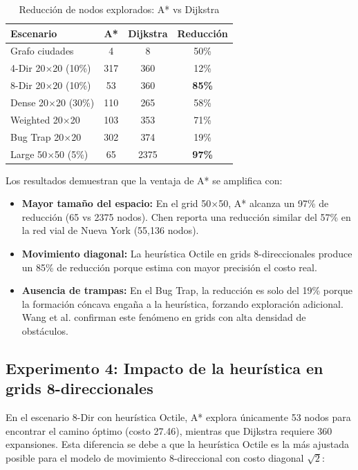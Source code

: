 \begin{table}[H]
\centering
\caption{Reducción de nodos explorados: A* vs Dijkstra}
\label{tab:efficiency}
\renewcommand{\arraystretch}{1.3}
\begin{tabular}{@{}lccc@{}}
\toprule
\textbf{Escenario} & \textbf{A*} & \textbf{Dijkstra} & \textbf{Reducción} \\
\midrule
Grafo ciudades & 4 & 8 & 50\% \\
4-Dir 20$\times$20 (10\%) & 317 & 360 & 12\% \\
8-Dir 20$\times$20 (10\%) & 53 & 360 & \textbf{85\%} \\
Dense 20$\times$20 (30\%) & 110 & 265 & 58\% \\
Weighted 20$\times$20 & 103 & 353 & 71\% \\
Bug Trap 20$\times$20 & 302 & 374 & 19\% \\
Large 50$\times$50 (5\%) & 65 & 2375 & \textbf{97\%} \\
\bottomrule
\end{tabular}
\end{table}

Los resultados demuestran que la ventaja de A* se amplifica con:
\begin{itemize}
    \item \textbf{Mayor tamaño del espacio:} En el grid 50$\times$50, A* alcanza un 97\% de reducción (65 vs 2375 nodos). Chen \cite{chen2022improved} reporta una reducción similar del 57\% en la red vial de Nueva York (55,136 nodos).
    \item \textbf{Movimiento diagonal:} La heurística Octile en grids 8-direccionales produce un 85\% de reducción porque estima con mayor precisión el costo real.
    \item \textbf{Ausencia de trampas:} En el Bug Trap, la reducción es solo del 19\% porque la formación cóncava engaña a la heurística, forzando exploración adicional. Wang et al. \cite{wang2022ebs} confirman este fenómeno en grids con alta densidad de obstáculos.
\end{itemize}

\subsection{Experimento 4: Impacto de la heurística en grids 8-direccionales}

En el escenario 8-Dir con heurística Octile, A* explora únicamente 53 nodos para encontrar el camino óptimo (costo 27.46), mientras que Dijkstra requiere 360 expansiones. Esta diferencia se debe a que la heurística Octile es la más ajustada posible para el modelo de movimiento 8-direccional con costo diagonal $\sqrt{2}$:

